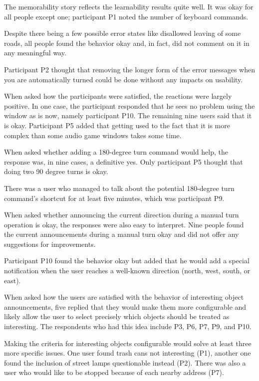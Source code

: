 \documentclass[nolof,digital]{fithesis3}
\begin{document}
The memorability story reflects the learnability results quite well. It was okay for all people except one; participant P1 noted the number of keyboard commands.

Despite there being a few possible error states like disallowed leaving of some roads, all people found the behavior okay and, in fact, did not comment on it in any meaningful way.

Participant P2 thought that removing the longer form of the error messages when you are automatically turned could be done without any impacts on usability.

When asked how the participants were satisfied, the reactions were largely positive. In one case, the participant responded that he sees no problem using the window as is now, namely participant P10. The remaining nine users said that it is okay. Participant P5 added that getting used to the fact that it is more complex than some audio game windows takes some time.

When asked whether adding a 180-degree turn command would help, the response was, in nine cases, a definitive yes. Only participant P5 thought that doing two 90 degree turns is okay.

There was a user who managed to talk about the potential 180-degree turn command's shortcut for at least five minutes, which was participant P9.

When asked whether announcing the current direction during a manual turn operation is okay, the responses were also easy to interpret. Nine people found the current announcements during a manual turn okay and did not offer any suggestions for improvements.

Participant P10 found the behavior okay but added that he would add a special notification when the user reaches a well-known direction (north, west, south, or east).

When asked how the users are satisfied with the behavior of interesting object announcements, five replied that they would make them more configurable and likely allow the user to select precisely which objects should be treated as interesting. The respondents who had this idea include P3, P6, P7, P9, and P10.

Making the criteria for interesting objects configurable would solve at least three more specific issues. One user found trash cans not interesting (P1), another one found the inclusion of street lamps questionable instead (P2). There was also a user who would like to be stopped because of each nearby address (P7).
\end{document}
